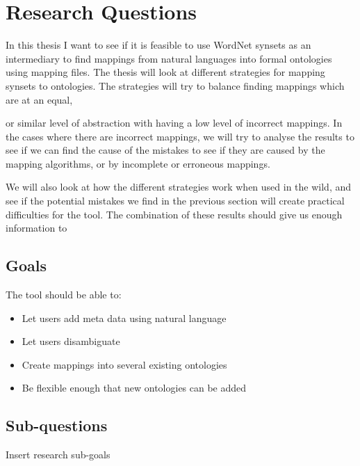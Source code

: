 
\section{Research Questions}
In this thesis I want to see if it is feasible to use WordNet synsets as an intermediary 
to find mappings from natural languages into formal ontologies using mapping files.
The thesis will look at different strategies for mapping synsets to ontologies. 
The strategies will try to balance finding mappings which are at an equal, 

or similar level of abstraction with having a low level of incorrect mappings.
In the cases where there are incorrect mappings, 
we will try to analyse the results to see if we can find the cause of the mistakes to see if they are caused by the 
mapping algorithms, or by incomplete or erroneous mappings.

We will also look at how the different strategies work when used in the wild, 
and see if the potential mistakes we find
in the previous section will create practical difficulties for the tool. 
The combination of these results should give us enough information to 
\subsection{Goals}

The tool should be able to:
\begin{itemize}
	\item Let users add meta data using natural language
	\item Let users disambiguate
	\item Create mappings into several existing ontologies
	\item Be flexible enough that new ontologies can be added
\end{itemize}

\subsection{Sub-questions}
Insert research sub-goals
